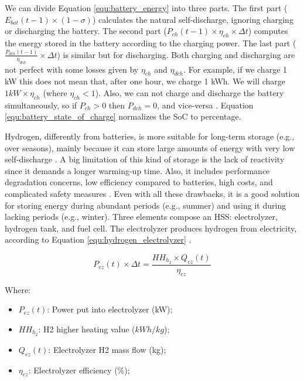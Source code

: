 We can divide Equation \ref{equ:battery_energy} into three parts. The first part ($E_{bat}(t-1) \times (1 - \sigma)$) calculates the natural self-discharge, ignoring charging or discharging the battery. The second part ($P_{ch}(t-1) \times \eta_{ch} \times \Delta t$) computes the energy stored in the battery according to the charging power. The last part ($\frac{P_{dch}(t-1)}{\eta_{dch}} \times \Delta t$) is similar but for discharging. Both charging and discharging are not perfect with some losses given by $\eta_{ch}$ and $\eta_{dch}$. For example, if we charge 1 kW this does not mean that, after one hour, we charge 1 kWh. We will charge $1 kW \times \eta_{ch}$ (where $\eta_{ch} < 1$). Also, we can not charge and discharge the battery simultaneously, so if $P_{ch} > 0$ then $P_{dch} = 0$, and vice-versa \cite{haddad2019mixed}. Equation \ref{equ:battery_state_of_charge} normalizes the SoC to percentage.

Hydrogen, differently from batteries, is more suitable for long-term storage (e.g., over seasons), mainly because it can store large amounts of energy with very low self-discharge \cite{pregger2009prospects}. A big limitation of this kind of storage is the lack of reactivity since it demands a longer warming-up time. Also, it includes performance degradation concerns, low efficiency compared to batteries, high costs, and complicated safety measures \cite{rostirolla2022survey}. Even with all these drawbacks, it is a good solution for storing energy during abundant periods (e.g., summer) and using it during lacking periods (e.g., winter). Three elements compose an HSS: electrolyzer, hydrogen tank, and fuel cell. The electrolyzer produces hydrogen from electricity, according to Equation \ref{equ:hydrogen_electrolyzer} \cite{haddad2019mixed}.

\begin{equation}
    \label{equ:hydrogen_electrolyzer}
    P_{ez}(t) \times \Delta t = \frac{HH_{h_{2}} \times Q_{ez}(t)}{\eta_{ez}}
\end{equation}

Where:
\begin{itemize}
    \item $P_{ez}(t)$: Power put into electrolyzer (kW);
    \item $HH_{h_{2}}$: H2 higher heating value ($kWh / kg$);
    \item $Q_{ez}(t)$: Electrolyzer H2 mass flow (kg);
    \item $\eta_{ez}$: Electrolyzer efficiency (\%);
\end{itemize}

